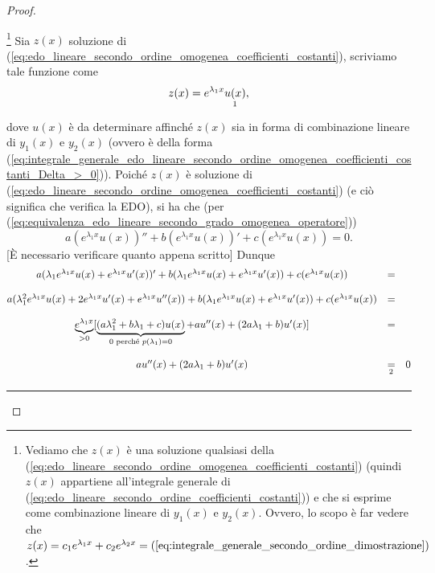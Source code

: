 \begin{proof}
\begin{enumerate}
		\footnote{Vediamo che $z(x)$ è una soluzione qualsiasi della (\ref{eq:edo_lineare_secondo_ordine_omogenea_coefficienti_costanti}) (quindi $z(x)$ appartiene all'integrale generale di (\ref{eq:edo_lineare_secondo_ordine_coefficienti_costanti})) e che si esprime come combinazione lineare di $y_1(x)$ e $y_2(x)$. Ovvero, lo scopo è far vedere che $z(x)=c_1 e^{\lambda_1x}+c_2e^{\lambda_2 x}=(\ref{eq:integrale_generale_secondo_ordine_dimostrazione})$.} Sia $z(x)$ soluzione di  (\ref{eq:edo_lineare_secondo_ordine_omogenea_coefficienti_costanti}), scriviamo tale funzione come
		\begin{equation}\label{eq:integrale_generale_secondo_ordine_dimostrazione}
			z(x) = e^{\lambda_1 x}\underset{\footnotemark}{u(x)},
		\end{equation}
		dove $u(x)$ è da determinare affinché $z(x)$ sia in forma di combinazione lineare di $y_1(x)$ e $y_2(x)$ (ovvero è della forma (\ref{eq:integrale_generale_edo_lineare_secondo_ordine_omogenea_coefficienti_costanti_Delta_>_0})).
		Poiché $z(x)$ è soluzione di  (\ref{eq:edo_lineare_secondo_ordine_omogenea_coefficienti_costanti}) (e ciò significa che verifica la EDO), si ha che (per (\ref{eq:equivalenza_edo_lineare_secondo_grado_omogenea_operatore}))
		\begin{equation*}
			a(e^{\lambda_1x}u(x))''+ b(e^{\lambda_1x}u(x))'+ c (e^{\lambda_1x}u(x)) = 0.
		\end{equation*}
		[È necessario verificare quanto appena scritto] Dunque
		\begin{equation}\label{eq:dimostrazione_th_soluzioni_edo_secondo_ordine}
			\begin{matrix}
				a(\lambda_1e^{\lambda_1x}u(x)+e^{\lambda_1x}u'(x))' + b(\lambda_1 e^{\lambda_1 x}u(x) + e^{\lambda_1x}u'(x)) + c(e^{\lambda_1x}u(x)) &=&\\\\
				a(\lambda_1^2e^{\lambda_1 x}u(x) + 2 e^{\lambda_1 x} u'(x) + e^{\lambda_1 x}u''(x))+ b (\lambda_1 e^{\lambda_1 x}u(x) + e^{\lambda_1 x}u'(x)) + 
				c(e^{\lambda_1 x}u(x)) &=&\\\\
				 \underbrace{e^{\lambda_1 x}}_{>0} [\underbrace{(a\lambda_1^2+b\lambda_1 +c) u(x)}_{0\text{ perché } p(\lambda_1)=0} + a u''(x)+(2a\lambda_1 + b)u'(x)]&=&\\\\
				 a u''(x)+(2a\lambda_1 + b)u'(x) &\underset{\footnotemark}{=}& 0
			\end{matrix}
		\end{equation}
		\hrule\vspace{-12px}

\end{enumerate}
\end{proof}
